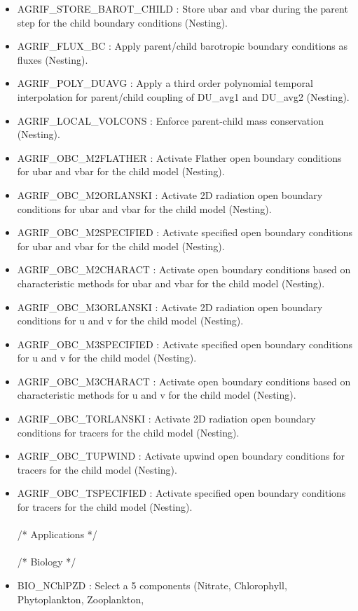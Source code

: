 \begin{itemize}
\item AGRIF\_STORE\_BAROT\_CHILD : Store ubar and vbar during the parent step for the
child boundary conditions (Nesting).
\item AGRIF\_FLUX\_BC : Apply parent/child barotropic boundary conditions as 
fluxes (Nesting).
\item AGRIF\_POLY\_DUAVG : Apply a third order polynomial temporal interpolation 
for parent/child coupling of DU\_avg1 and DU\_avg2 (Nesting).
\item AGRIF\_LOCAL\_VOLCONS : Enforce parent-child mass conservation (Nesting).
\item AGRIF\_OBC\_M2FLATHER :  Activate Flather open boundary conditions for ubar and vbar
for the child model (Nesting).
\item AGRIF\_OBC\_M2ORLANSKI : Activate 2D radiation open boundary conditions for ubar and vbar
for the child model (Nesting).
\item AGRIF\_OBC\_M2SPECIFIED : Activate specified open boundary conditions for ubar and vbar
for the child model (Nesting).
\item AGRIF\_OBC\_M2CHARACT :  Activate open boundary conditions based on characteristic methods 
for ubar and vbar
for the child model (Nesting).
\item AGRIF\_OBC\_M3ORLANSKI : Activate 2D radiation open boundary conditions for u and v
for the child model (Nesting).
\item AGRIF\_OBC\_M3SPECIFIED : Activate specified open boundary conditions for u and v
for the child model (Nesting).
\item AGRIF\_OBC\_M3CHARACT : Activate open boundary conditions based on characteristic methods 
for u and v
for the child model (Nesting).
\item AGRIF\_OBC\_TORLANSKI :  Activate 2D radiation open boundary conditions for tracers
for the child model (Nesting).
\item AGRIF\_OBC\_TUPWIND : Activate upwind open boundary conditions for tracers
for the child model (Nesting).
\item AGRIF\_OBC\_TSPECIFIED  : Activate specified open boundary conditions for tracers
for the child model (Nesting).
\\ \\ /*           Applications */
\\ \\ /*           Biology */
\item BIO\_NChlPZD : Select a 5 components (Nitrate, Chlorophyll, Phytoplankton, Zooplankton,

\end{itemize}
